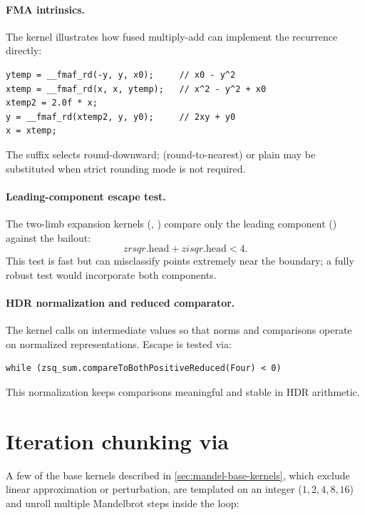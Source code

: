 \paragraph{FMA intrinsics.}
The  kernel illustrates how fused multiply-add can
implement the recurrence directly:
\begin{lstlisting}
ytemp = __fmaf_rd(-y, y, x0);     // x0 - y^2
xtemp = __fmaf_rd(x, x, ytemp);   // x^2 - y^2 + x0
xtemp2 = 2.0f * x;
y = __fmaf_rd(xtemp2, y, y0);     // 2xy + y0
x = xtemp;
\end{lstlisting}
The  suffix selects round-downward;  (round-to-nearest)
or plain  may be substituted when strict rounding mode is not required.

\paragraph{Leading-component escape test.}
The two-limb expansion kernels (,
) compare only the leading component
() against the bailout:
\[
  zrsqr.\mathrm{head} + zisqr.\mathrm{head} < 4.
\]
This test is fast but can misclassify points extremely near the boundary; a fully
robust test would incorporate both components.

\paragraph{HDR normalization and reduced comparator.}
The  kernel calls  on intermediate
values so that norms and comparisons operate on normalized representations.
Escape is tested via:
\begin{lstlisting}
while (zsq_sum.compareToBothPositiveReduced(Four) < 0)
\end{lstlisting}
This normalization keeps comparisons meaningful and stable in HDR arithmetic.


\section{Iteration chunking via }
\label{sec:chunking}

A few of the base kernels described in \cref{sec:mandel-base-kernels}, which exclude linear approximation or
perturbation, are templated on an integer 
(\(1,2,4,8,16\)) and unroll multiple Mandelbrot steps inside the loop:

